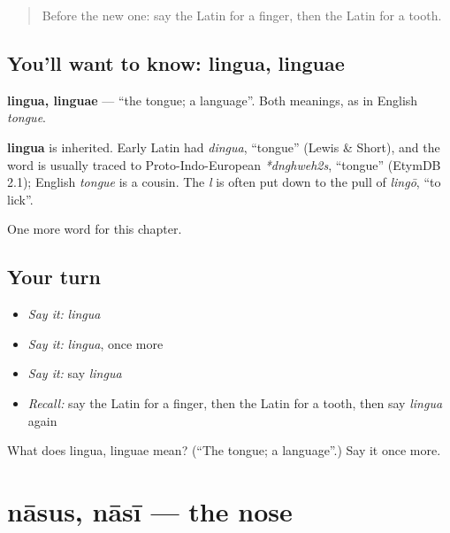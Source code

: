\label{lesson:LA-C63-lingua}



\begin{quote}
Before the new one: say the Latin for a finger, then the Latin for a tooth.
\end{quote}

\subsection*{You'll want to know: lingua, linguae}
\textbf{lingua, linguae} — \textquotedblleft{}the tongue; a language\textquotedblright{}. Both meanings, as in English \emph{tongue}.

\begin{cousinweb}
\textbf{lingua} is inherited. Early Latin had \emph{dingua}, \textquotedblleft{}tongue\textquotedblright{} (Lewis \& Short), and the word is usually traced to Proto-Indo-European \emph{*dnghweh2s}, \textquotedblleft{}tongue\textquotedblright{} (EtymDB 2.1); English \emph{tongue} is a cousin. The \emph{l} is often put down to the pull of \emph{lingō}, \textquotedblleft{}to lick\textquotedblright{}.
\end{cousinweb}

\begin{grammarlens}[title={What you've built}]
One more word for this chapter.
\end{grammarlens}

\subsection*{Your turn}
\begin{itemize}
\raggedright
  \item \emph{Say it:} \emph{lingua}
  \item \emph{Say it:} \emph{lingua}, once more
  \item \emph{Say it:} say \emph{lingua}
  \item \emph{Recall:} say the Latin for a finger, then the Latin for a tooth, then say \emph{lingua} again
\end{itemize}

\begin{tcolorbox}[breakable,colback=teal!4,colframe=teal!35!black,title={Before you move on}]
What does lingua, linguae mean? (\textquotedblleft{}The tongue; a language\textquotedblright{}.) Say it once more.
\end{tcolorbox}
\section[nāsus, nāsī]{nāsus, nāsī — the nose}

